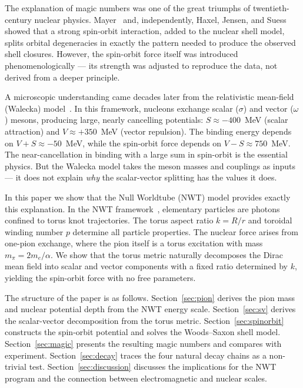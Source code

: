 \documentclass[11pt,a4paper]{article}
\begin{document}
The explanation of magic numbers was one of the great triumphs of twentieth-century
nuclear physics.  Mayer~\cite{mayer1949} and, independently, Haxel, Jensen, and
Suess~\cite{haxel1949} showed that a strong spin-orbit interaction, added to the
nuclear shell model, splits orbital degeneracies in exactly the pattern needed to
produce the observed shell closures.  However, the spin-orbit force itself was
introduced phenomenologically --- its strength was adjusted to reproduce the data,
not derived from a deeper principle.

A microscopic understanding came decades later from the relativistic mean-field
(Walecka) model~\cite{walecka1974,serot1986}.  In this framework, nucleons
exchange scalar ($\sigma$) and vector ($\omega$) mesons, producing large,
nearly cancelling potentials: $S \approx -400$~MeV (scalar attraction) and
$V \approx +350$~MeV (vector repulsion).  The binding energy depends on
$V + S \approx -50$~MeV, while the spin-orbit force depends on
$V - S \approx 750$~MeV.  The near-cancellation in binding with a large sum in
spin-orbit is the essential physics.  But the Walecka model takes the meson
masses and couplings as inputs --- it does not explain \emph{why} the
scalar-vector splitting has the values it does.

In this paper we show that the Null Worldtube (NWT) model provides exactly this
explanation.  In the NWT framework~\cite{paper1,paper2}, elementary particles
are photons confined to torus knot trajectories.  The torus aspect ratio $k = R/r$
and toroidal winding number $p$ determine all particle properties.  The nuclear
force arises from one-pion exchange, where the pion itself is a torus excitation
with mass $m_\pi = 2m_e/\alpha$.  We show that the torus metric naturally
decomposes the Dirac mean field into scalar and vector components with a fixed
ratio determined by $k$, yielding the spin-orbit force with no free parameters.

The structure of the paper is as follows.  Section~\ref{sec:pion} derives the
pion mass and nuclear potential depth from the NWT energy scale.
Section~\ref{sec:sv} derives the scalar-vector decomposition from the torus metric.
Section~\ref{sec:spinorbit} constructs the spin-orbit potential and solves the
Woods--Saxon shell model.
Section~\ref{sec:magic} presents the resulting magic numbers and compares with
experiment.
Section~\ref{sec:decay} traces the four natural decay chains as a non-trivial
test.
Section~\ref{sec:discussion} discusses the implications for the NWT program and
the connection between electromagnetic and nuclear scales.
\end{document}
